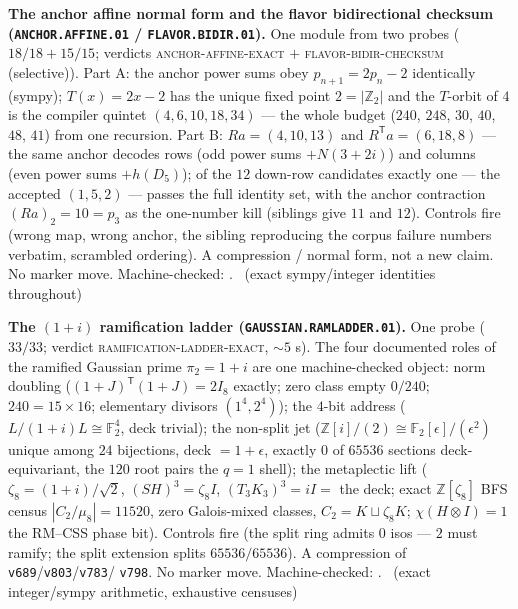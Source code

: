 \documentclass[11pt,a4paper]{article}
\newcommand{\Z}{\mathbb{Z}}
\theoremstyle{definition}
\begin{document}
\par\smallskip\noindent\textbf{The anchor affine normal form and
the flavor bidirectional checksum (\texttt{ANCHOR.AFFINE.01} /
\texttt{FLAVOR.BIDIR.01}).}
One module from two probes ($18/18 + 15/15$; verdicts
\textsc{anchor-affine-exact} $+$ \textsc{flavor-bidir-checksum}
(selective)).  Part A: the anchor power sums obey
$p_{n+1} = 2p_n - 2$ identically (sympy); $T(x) = 2x - 2$ has the
unique fixed point $2 = |\Z_2|$ and the $T$-orbit of $4$ is the
compiler quintet $(4, 6, 10, 18, 34)$ --- the whole budget
($240$, $248$, $30$, $40$, $48$, $41$) from one recursion.  Part
B: $Ra = (4, 10, 13)$ and $R^{\mathsf T}a = (6, 18, 8)$ --- the
same anchor decodes rows (odd power sums $+ N(3{+}2i)$) and
columns (even power sums $+ h(D_5)$); of the $12$ down-row
candidates exactly one --- the accepted $(1,5,2)$ --- passes the
full identity set, with the anchor contraction $(Ra)_2 = 10 =
p_3$ as the one-number kill (siblings give $11$ and $12$).
Controls fire (wrong map, wrong anchor, the sibling reproducing
the corpus failure numbers verbatim, scrambled ordering).  A
compression / normal form, not a new claim.  No marker move.
Machine-checked: .
\mE\ (exact sympy/integer identities throughout)
\par\smallskip

\par\smallskip\noindent\textbf{The $(1{+}i)$ ramification ladder
(\texttt{GAUSSIAN.RAMLADDER.01}).}
One probe ($33/33$; verdict \textsc{ramification-ladder-exact},
$\sim5$ s).  The four documented roles of the ramified Gaussian
prime $\pi_2 = 1{+}i$ are one machine-checked object: norm
doubling ($(1{+}J)^{\mathsf T}(1{+}J) = 2I_8$ exactly; zero class
empty $0/240$; $240 = 15\times16$; elementary divisors
$(1^4,2^4)$); the $4$-bit address ($L/(1{+}i)L \cong \mathbb
F_2^4$, deck trivial); the non-split jet ($\Z[i]/(2) \cong
\mathbb F_2[\epsilon]/(\epsilon^2)$ unique among $24$ bijections,
deck $= 1{+}\epsilon$, exactly $0$ of $65536$ sections
deck-equivariant, the $120$ root pairs the $q{=}1$ shell); the
metaplectic lift ($\zeta_8 = (1{+}i)/\sqrt2$, $(SH)^3 = \zeta_8I$,
$(T_3K_3)^3 = iI =$ the deck; exact $\Z[\zeta_8]$ BFS census
$|C_2/\mu_8| = 11520$, zero Galois-mixed classes,
$C_2 = K \sqcup \zeta_8K$; $\chi(H{\otimes}I) = 1$ the RM--CSS
phase bit).  Controls fire (the split ring admits $0$ isos ---
$2$ must ramify; the split extension splits $65536/65536$).  A
compression of \texttt{v689}/\texttt{v803}/\texttt{v783}/%
\texttt{v798}.  No marker move.
Machine-checked: .
\mE\ (exact integer/sympy arithmetic, exhaustive censuses)
\par\smallskip
\end{document}
